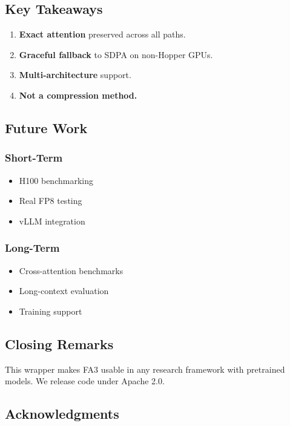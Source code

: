 \subsection{Key Takeaways}

\begin{enumerate}
\item \textbf{Exact attention} preserved across all paths.
\item \textbf{Graceful fallback} to SDPA on non-Hopper GPUs.
\item \textbf{Multi-architecture} support.
\item \textbf{Not a compression method.}

\end{enumerate}
\subsection{Future Work}

\subsubsection{Short-Term}
\begin{itemize}
\item H100 benchmarking
\item Real FP8 testing
\item vLLM integration

\end{itemize}
\subsubsection{Long-Term}
\begin{itemize}
\item Cross-attention benchmarks
\item Long-context evaluation
\item Training support

\end{itemize}
\subsection{Closing Remarks}

This wrapper makes FA3 usable in any research framework with pretrained 
models. We release code under Apache 2.0.

\subsection{Acknowledgments}

